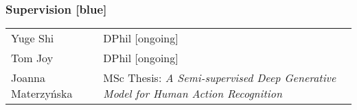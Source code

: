 \documentclass[a4paper]{article}
\newcommand{\rline}[1]{\hspace*{2ex}\xrfill[0.5ex]{2pt}[#1]\hspace*{0ex}}
\begin{document}
\subsubsection*{Supervision \rline{blue}}
\begin{center}
  \small
  \begin{tabular*}{\textwidth}{@{}ll@{\extracolsep{\fill}\,}}
    Yuge Shi
    & DPhil [ongoing]
    \\
    Tom Joy
    & DPhil [ongoing]
    \\
    Joanna Materzy\'{n}ska
    & MSc Thesis: \textsl{A Semi-supervised Deep Generative Model for Human Action Recognition}
  \end{tabular*}
\end{center}

\end{document}
